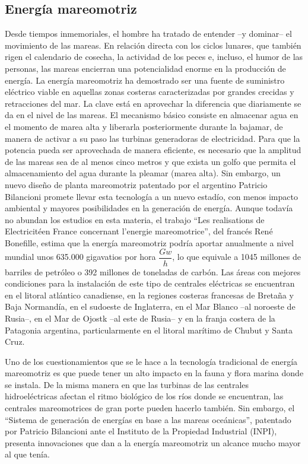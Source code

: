 \documentclass[12pt,letterpaper,superscriptaddress]{article}
\begin{document}
\subsection{Energía mareomotriz}

Desde tiempos inmemoriales, el hombre ha tratado de entender –y dominar– el movimiento de las mareas. En relación directa con los ciclos lunares, que también rigen el calendario de cosecha, la actividad de los peces e, incluso, el humor de las personas, las mareas encierran una potencialidad enorme en la producción de energía.
La energía mareomotriz ha demostrado ser una fuente de suministro eléctrico viable en aquellas zonas costeras caracterizadas por grandes crecidas y retracciones del mar. La clave está en aprovechar la diferencia que diariamente se da en el nivel de las mareas. El mecanismo básico consiste en almacenar agua en el momento de marea alta y liberarla posteriormente durante la bajamar, de manera de activar a su paso las turbinas generadoras de electricidad. Para que la potencia pueda ser aprovechada de manera eficiente, es necesario que la amplitud de las mareas sea de al menos cinco metros y que exista un golfo que permita el almacenamiento del agua durante la pleamar (marea alta).
Sin embargo, un nuevo diseño de planta mareomotriz patentado por el argentino Patricio Bilancioni promete llevar esta tecnología a un nuevo estadío, con menos impacto ambiental y mayores posibilidades en la generación de energía.
Aunque todavía no abundan los estudios en esta materia, el trabajo “Les realisations de Electricitéen France concernant l’energie mareomotrice”, del francés René Bonefille, estima que la energía mareomotriz podría aportar anualmente a nivel mundial unos 635.000 gigavatios por hora $\dfrac{Gw}{h}$, lo que equivale a 1045 millones de barriles de petróleo o 392 millones de toneladas de carbón. Las áreas con mejores condiciones para la instalación de este tipo de centrales eléctricas se encuentran en el litoral atlántico canadiense, en la regiones costeras francesas de Bretaña y Baja Normandía, en el sudoeste de Inglaterra, en el Mar Blanco –al noroeste de Rusia–, en el Mar de Ojostk –al este de Rusia– y en la franja costera de la Patagonia argentina, particularmente en el litoral marítimo de Chubut y Santa Cruz.


Uno de los cuestionamientos que se le hace a la tecnología tradicional de energía mareomotriz es que puede tener un alto impacto en la fauna y flora marina donde se instala. De la misma manera en que las turbinas de las centrales hidroeléctricas afectan el ritmo biológico de los ríos donde se encuentran, las centrales mareomotrices de gran porte pueden hacerlo también. Sin embargo, el “Sistema de generación de energías en base a las mareas oceánicas”, patentado por Patricio Bilancioni ante el Instituto de la Propiedad Industrial (INPI), presenta innovaciones que dan a la energía mareomotriz un alcance mucho mayor al que tenía.
\end{document}
